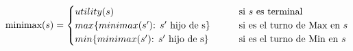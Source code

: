 \documentclass[preview]{standalone}
\begin{document}
\begin{align*}
\text{minimax($s$)} =  \begin{cases}
                                 utility(s) \qquad &\text{si $s$ es terminal} \cr
                                 max\{minimax(\text{$s'$): $s'$ hijo de }$s$\}\qquad &\text{si es el turno de Max en $s$} \cr
                                 min\{minimax(\text{$s'$): $s'$ hijo de }$s$\}\qquad &\text{si es el turno de Min en $s$} \cr
                                 \end{cases}
\end{align*}
\end{document}
